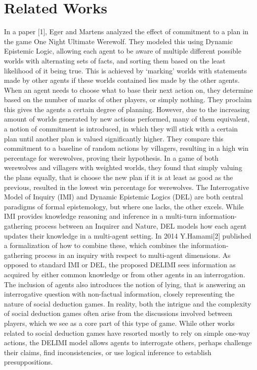 \section{Related Works}
In a paper [1], Eger and Martens analyzed the effect of commitment to a plan in
the game One Night Ultimate Werewolf. They modeled this using Dynamic Epistemic
Logic, allowing each agent to be aware of multiple different possible worlds
with alternating sets of facts, and sorting them based on the least likelihood
of it being true. This is achieved by ‘marking’ worlds with statements made by
other agents if these worlds contained lies made by the other agents. When an
agent needs to choose what to base their next action on, they determine based
on the number of marks of other players, or simply nothing. They proclaim this
gives the agents a certain degree of planning. However, due to the increasing
amount of worlds generated by new actions performed, many of them equivalent, a
notion of commitment is introduced, in which they will stick with a certain
plan until another plan is valued significantly higher. They compare this
commitment to a baseline of random actions by villagers, resulting in a high
win percentage for werewolves, proving their hypothesis. In a game of both
werewolves and villagers with weighted worlds, they found that simply valuing
the plans equally, that is choose the new plan if it is at least as good as the
previous, resulted in the lowest win percentage for werewolves. The
Interrogative Model of Inquiry (IMI) and Dynamic Epistemic Logics (DEL) are
both central paradigms of formal epistemology, but where one lacks, the other
excels. While IMI provides knowledge reasoning and inference in a multi-turn
information-gathering process between an Inquirer and Nature, DEL models how
each agent updates their knowledge in a multi-agent setting. In 2014
Y.Hamami[2] published a formalization of how to combine these, which combines
the information-gathering process in an inquiry with respect to multi-agent
dimensions. As opposed to standard IMI or DEL, the proposed DELIMI sees
information as acquired by either common knowledge or from other agents in an
interrogation. The inclusion of agents also introduces the notion of lying,
that is answering an interrogative question with non-factual information,
closely representing the nature of social deduction games. In reality, both the
intrigue and the complexity of social deduction games often arise from the
discussions involved between players, which we see as a core part of this type
of game. While other works related to social deduction games have resorted
mostly to rely on simple one-way actions, the DELIMI model allows agents to
interrogate others, perhaps challenge their claims, find inconsistencies, or
use logical inference to establish presuppositions.